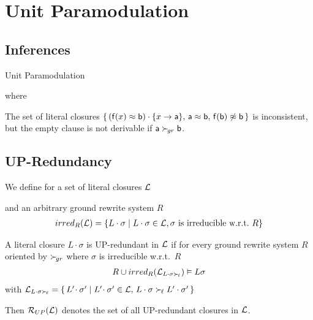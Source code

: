 \documentclass[%
handout,
]{beamer}
\begin{document}
\section{Unit Paramodulation}
\subsection{Inferences}
\begin{frame}{Unit Paramodulation}

    
    where
    

    \vspace{1.4em}
    \begin{remark}
    The set of literal closures
    $\{\,
    (\mathsf{f}(x)\approx\mathsf{b})\cdot\{x\to\mathsf{a}\},\, 
    \mathsf{a}\approx \mathsf{b},\,
    \mathsf{f}(\mathsf{b})\not\approx\mathsf{b}\,
    \}$ is inconsistent,
    but the empty clause is not derivable
    if $\mathsf{a}\mathrel\succ_{\!gr}\mathsf{b}$.
    \end{remark}
    
\end{frame}


\subsection{UP-Redundancy}
\begin{frame}[allowframebreaks]
        
        We define for a set of literal closures $\mathcal{L}$ 
        
        and an
        arbitrary ground rewrite system $R$
        \begin{gather*}
            irred_R(\mathcal{L}) = \{
                L\cdot\sigma \mid
                L\cdot\sigma\in\mathcal{L},
                \sigma\text{ is irreducible w.r.t.~}R
            \}
        \end{gather*}
    
    A literal closure $L\cdot\sigma$ is UP-redundant in $\mathcal{L}$ if
    for every ground rewrite system $R$ 
    oriented by $\mathrel\succ_{\!gr}$ 
    where $\sigma$ is irreducible w.r.t.~$R$
    \begin{gather*}
    R \cup irred_R(\mathcal{L}_{L\cdot\sigma\mathrel\succ_{\!\ell}}) \vDash L\sigma
    \end{gather*}
    with 
    $
        \mathcal{L}_{L\cdot\sigma\mathrel\succ_{\!\ell}} = \{\,
            L'\!\cdot\sigma' \mid
            L'\!\cdot\sigma'\in\mathcal{L},\,
            L\cdot\sigma\mathrel\succ_{\!\ell} L'\cdot\sigma'
        \,\}
    $

    \vspace{1.4em}
    Then $\mathcal{R}_{UP}(\mathcal{L})$ denotes the set of all UP-redundant closures in $\mathcal{L}$.

\end{frame}
\end{document}
